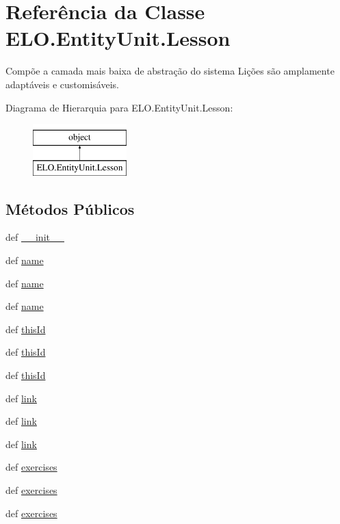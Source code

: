 \hypertarget{classELO_1_1EntityUnit_1_1Lesson}{\section{Referência da Classe E\-L\-O.\-Entity\-Unit.\-Lesson}
\label{classELO_1_1EntityUnit_1_1Lesson}
}


Compõe a camada mais baixa de abstração do sistema Lições são amplamente adaptáveis e customisáveis.  


Diagrama de Hierarquia para E\-L\-O.\-Entity\-Unit.\-Lesson\-:\begin{figure}[H]
\begin{center}
\leavevmode
\includegraphics[height=2.000000cm]{dc/d13/classELO_1_1EntityUnit_1_1Lesson}
\end{center}
\end{figure}
\subsection*{Métodos Públicos}
\begin{DoxyCompactItemize}
\item 
def \hyperlink{classELO_1_1EntityUnit_1_1Lesson_a263c8aacf2bb8a0489283177c0091a67}{\-\_\-\-\_\-init\-\_\-\-\_\-}
\item 
def \hyperlink{classELO_1_1EntityUnit_1_1Lesson_a5af62a54f008a391543fd8fabf30edcf}{name}
\item 
def \hyperlink{classELO_1_1EntityUnit_1_1Lesson_a5af62a54f008a391543fd8fabf30edcf}{name}
\item 
def \hyperlink{classELO_1_1EntityUnit_1_1Lesson_a5af62a54f008a391543fd8fabf30edcf}{name}
\item 
def \hyperlink{classELO_1_1EntityUnit_1_1Lesson_a1947d2d6413e7e94c8c524efe271af12}{this\-Id}
\item 
def \hyperlink{classELO_1_1EntityUnit_1_1Lesson_a1947d2d6413e7e94c8c524efe271af12}{this\-Id}
\item 
def \hyperlink{classELO_1_1EntityUnit_1_1Lesson_a1947d2d6413e7e94c8c524efe271af12}{this\-Id}
\item 
def \hyperlink{classELO_1_1EntityUnit_1_1Lesson_a8560623b79e4379c2ba74aaf678a4764}{link}
\item 
def \hyperlink{classELO_1_1EntityUnit_1_1Lesson_a8560623b79e4379c2ba74aaf678a4764}{link}
\item 
def \hyperlink{classELO_1_1EntityUnit_1_1Lesson_a8560623b79e4379c2ba74aaf678a4764}{link}
\item 
def \hyperlink{classELO_1_1EntityUnit_1_1Lesson_a49ad3f9952188497a01afdd31db8000c}{exercises}
\item 
def \hyperlink{classELO_1_1EntityUnit_1_1Lesson_a49ad3f9952188497a01afdd31db8000c}{exercises}
\item 
def \hyperlink{classELO_1_1EntityUnit_1_1Lesson_a49ad3f9952188497a01afdd31db8000c}{exercises}
\end{DoxyCompactItemize}
